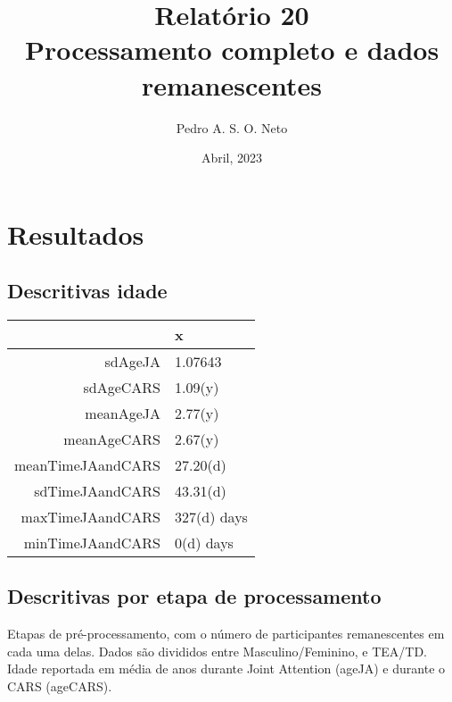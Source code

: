 \documentclass{article}
\title{Relatório 20 \\ Processamento completo e dados remanescentes}
\author{Pedro A. S. O. Neto}
\date{Abril, 2023}
\begin{document}
\maketitle

\section{Resultados}

\subsection{Descritivas idade}

\begin{table}[ht]
\centering
\begin{tabular}{rl}
  \hline
 & x \\ 
  \hline
sdAgeJA & 1.07643 \\ 
  sdAgeCARS & 1.09(y) \\ 
  meanAgeJA & 2.77(y) \\ 
  meanAgeCARS & 2.67(y) \\ 
  meanTimeJAandCARS & 27.20(d) \\ 
  sdTimeJAandCARS & 43.31(d) \\ 
  maxTimeJAandCARS & 327(d) days \\ 
  minTimeJAandCARS & 0(d) days \\ 
   \hline
\end{tabular}
\end{table}


\subsection{Descritivas por etapa de processamento}
Etapas de pré-processamento, com o número de participantes remanescentes em cada uma delas. Dados são divididos entre Masculino/Feminino, e TEA/TD. Idade reportada em média de anos durante Joint Attention (ageJA) e durante o CARS (ageCARS).
\end{document}
